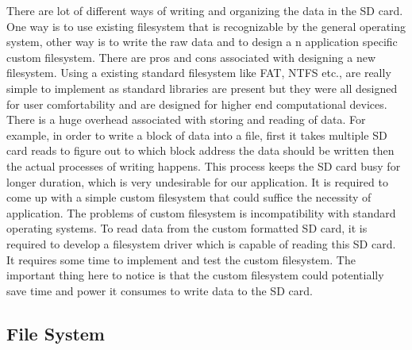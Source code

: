  \hspace{10mm}There are lot of different ways of writing and organizing the data in the SD card. One way is to use existing filesystem that is recognizable by the general operating system, other way is to write the raw data and to design a n application specific custom filesystem. There are pros and cons associated with designing a new filesystem. Using a existing standard filesystem like FAT, NTFS etc., are really simple to implement as standard libraries are present but they were all designed for user comfortability and are designed for higher end computational devices. There is a huge overhead associated with storing and reading of data. For example, in order to write a block of data into a file, first it takes multiple SD card reads to figure out to which block address the data should be written then the actual processes of writing happens. This process keeps the SD card busy for longer duration, which is very undesirable for our application. It is required to come up with a simple custom filesystem that could suffice the necessity of application. The problems of custom filesystem is incompatibility with standard operating systems. To read data from the custom formatted SD card, it is required to develop a filesystem driver which is capable of reading this SD card. It requires some time to implement and test the custom filesystem. The important thing here to notice is that the custom filesystem could potentially save time and power it consumes to write data to the SD card.


\subsection{File System}\label{filesystem} 

